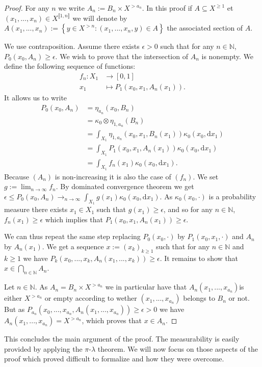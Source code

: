\documentclass{article}
\newcommand{\N}{\mathbb{N}}
\newcommand{\set}[1]{\left\{#1\right\}}
\newcommand{\eps}{\epsilon}
\newcommand{\Xge}[1]{X^{\ge#1}}
\newcommand{\Xgt}[1]{X^{>#1}}
\newcommand{\Xgtn}{X^{>n}}
\newcommand{\dx}{\mathrm{d}x}
\newcommand{\tendl}[1]{\longrightarrow_{#1}}
\newcommand{\dbrack}[1]{\llbracket #1 \rrbracket}
\newcommand{\ox}{\otimes}
\newcommand{\Xint}[1]{X^{\dbrack{#1}}}
\theoremstyle{definition}
\theoremstyle{remark}
\begin{document}
	\begin{proof}
		For any $n$ we write $A_n := B_n \times \Xgt{a_n}$. In this proof if $A \subseteq \Xge{1}$ et $(x_1, ..., x_n) \in \Xint{1,n}$ we will denote by $A(x_1,...,x_n) := \set{y \in \Xgtn : (x_1,...,x_n,y) \in A}$ the associated section of $A$.

		We use contraposition. Assume there exists $\eps>0$ such that for any $n \in \N$, $P_0(x_0,A_n) \ge \eps$. We wish to prove that the intersection of $A_n$ is nonempty. We define the following sequence of functions:
		\begin{align*}
			f_n : X_1 &\to [0, 1] \\
			x_1 &\mapsto P_1(x_0,x_1, A_n(x_1)).
		\end{align*}
		It allows us to write
		\begin{align*}
			P_0(x_0,A_n) &= \eta_{a_n}(x_0,B_n) \\
			&=\kappa_0 \ox \eta_{1, a_n}(B_n) \\
			&= \int_{X_1} \eta_{1, a_n}(x_0, x_1, B_n(x_1)) \kappa_0(x_0, \dx_1) \\
			&= \int_{X_1} P_1(x_0,x_1,A_n(x_1)) \kappa_0(x_0, \dx_1) \\
			&= \int_{X_1} f_n(x_1) \kappa_0(x_0, \dx_1).
		\end{align*}
		Because $(A_n)$ is non-increasing it is also the case of $(f_n)$. We set $g := \lim_{n\to\infty} f_n$. By dominated convergence theorem we get $\eps \le P_0(x_0,A_n) \tendl{n\to\infty} \int_{X_1} g(x_1) \kappa_0(x_0,\dx_1)$. As $\kappa_0(x_0, \cdot)$ is a probability measure there exists $x_1 \in X_1$ such that $g(x_1) \ge \eps$, and so for any $n\in\N$, $f_n(x_1) \ge \eps$ which implies that $P_1(x_0,x_1, A_n(x_1)) \ge \eps$.

		We can thus repeat the same step replacing $P_0(x_0,\cdot)$ by $P_1(x_0,x_1,\cdot)$ and $A_n$ by $A_n(x_1)$. We get a sequence $x := (x_k)_{k\ge1}$ such that for any $n\in\N$ and $k\ge1$ we have $P_k(x_0,...,x_k,A_n(x_1,...,x_k)) \ge \eps$. It remains to show that $x \in \bigcap_{n\in\N}A_n$.

		Let $n\in\N$. As $A_n = B_n \times \Xgt{a_n}$ we in particular have that $A_n(x_1,...,x_{a_n})$is either $\Xgt{a_n}$ or empty according to wether $(x_1,...,x_{a_n})$ belongs to $B_n$ or not. But as $P_{a_n}(x_0,...,x_{a_n},A_n(x_1,...,x_{a_n})) \ge \eps > 0$ we have $A_n(x_1,...,x_{a_n}) = \Xgt{a_n}$, which proves that $x \in A_n$.
	\end{proof}

	This concludes the main argument of the proof. The measurability is easily provided by applying the $\pi$-$\lambda$ theorem. We will now focus on those aspects of the proof which proved difficult to formalize and how they were overcome.
\end{document}
